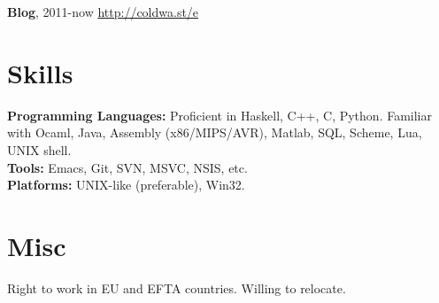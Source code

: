 \documentclass[margin,line]{res}
\begin{document}
\begin{resume}
{\bf Blog}, 2011-now \hfill \url{http://coldwa.st/e}

\section{\sc Skills}

{\bf Programming Languages:} Proficient in Haskell, C++, C, Python. Familiar
with Ocaml, Java, Assembly (x86/MIPS/AVR), Matlab, SQL, Scheme, Lua, UNIX shell. \\
{\bf Tools:} Emacs, Git, SVN, MSVC, NSIS, etc.\\
{\bf Platforms:} UNIX-like (preferable), Win32.



\section{\sc Misc}

Right to work in EU and EFTA countries. Willing to relocate.

\end{resume}
\end{document}
